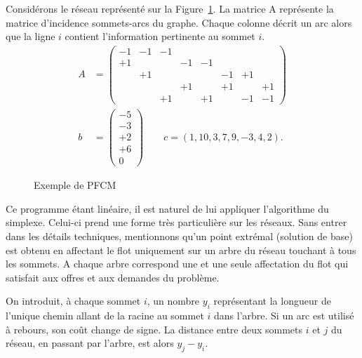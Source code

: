 Considérons le réseau représenté sur la Figure~\ref{fig:pfcm}.
La matrice A représente la matrice d'incidence sommets-arcs du graphe.
Chaque colonne décrit un arc alors que la ligne $i$ contient l'information pertinente au sommet $i$.
\begin{align*}
A & =
\begin{pmatrix}
-1 & -1 & -1 \\
+1 & & & -1 & -1 \\
& +1 & & & & -1 & +1 \\
& & & +1 & & +1 & & +1 \\
& & +1 & & +1 & & -1 & -1
\end{pmatrix} \\
b & =
\begin{pmatrix}
-5 \\
-3 \\
+2 \\
+6 \\
0
\end{pmatrix}
\qquad
c = ( 1, 10, 3, 7, 9, -3, 4, 2 ).
\end{align*}

\begin{figure}[htbp]
\begin{center}
\caption{Exemple de PFCM}
\label{fig:pfcm}
\end{center}
\end{figure}

Ce programme étant linéaire, il est naturel de lui appliquer l'algorithme du simplexe. Celui-ci prend une forme très particulière sur les réseaux.
Sans entrer dans les détails techniques, mentionnons qu'un point extrémal (solution de base) est obtenu en affectant le flot uniquement sur un arbre du réseau touchant à
tous les sommets.
A chaque arbre correspond une et une seule affectation du flot qui satisfait aux offres
et aux demandes du problème.

On introduit, à chaque sommet $i$, un nombre $y_i$ représentant la longueur de l'unique chemin allant de la racine au sommet $i$ dans l'arbre.
Si un arc est utilisé à rebours, son coût change de signe.
La distance entre deux sommets $i$ et $j$ du réseau, en passant par l'arbre, est alors $y_j - y_i$.